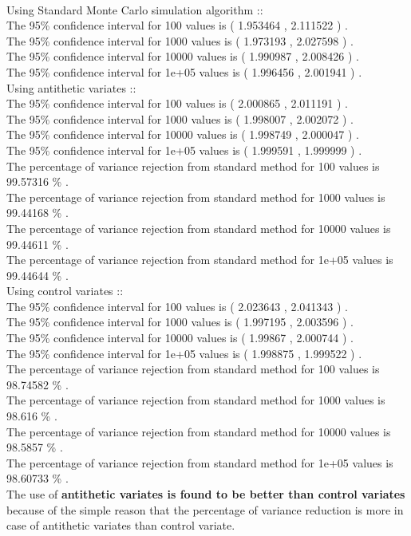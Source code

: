 \documentclass[11pt]{article}
\begin{document}
\newpage
{}\\
Using Standard Monte Carlo simulation algorithm ::\\
The 95\% confidence interval for 100 values is ( 1.953464 , 2.111522 ) .\\
The 95\% confidence interval for 1000 values is ( 1.973193 , 2.027598 ) .\\
The 95\% confidence interval for 10000 values is ( 1.990987 , 2.008426 ) .\\
The 95\% confidence interval for 1e+05 values is ( 1.996456 , 2.001941 ) .\\

Using antithetic variates ::\\
The 95\% confidence interval for 100 values is ( 2.000865 , 2.011191 ) .\\
The 95\% confidence interval for 1000 values is ( 1.998007 , 2.002072 ) .\\
The 95\% confidence interval for 10000 values is ( 1.998749 , 2.000047 ) .\\
The 95\% confidence interval for 1e+05 values is ( 1.999591 , 1.999999 ) .\\
The percentage of variance rejection from standard method for 100 values is 99.57316 \% .\\
The percentage of variance rejection from standard method for 1000 values is 99.44168 \% .\\
The percentage of variance rejection from standard method for 10000 values is 99.44611 \% .\\
The percentage of variance rejection from standard method for 1e+05 values is 99.44644 \% .\\

Using control variates ::\\
The 95\% confidence interval for 100 values is ( 2.023643 , 2.041343 ) .\\
The 95\% confidence interval for 1000 values is ( 1.997195 , 2.003596 ) .\\
The 95\% confidence interval for 10000 values is ( 1.99867 , 2.000744 ) .\\
The 95\% confidence interval for 1e+05 values is ( 1.998875 , 1.999522 ) .\\
The percentage of variance rejection from standard method for 100 values is 98.74582 \% .\\
The percentage of variance rejection from standard method for 1000 values is 98.616 \% .\\
The percentage of variance rejection from standard method for 10000 values is 98.5857 \% .\\
The percentage of variance rejection from standard method for 1e+05 values is 98.60733 \% .\\

The use of \textbf{antithetic variates is found to be better than control variates} because of the simple reason that the percentage of variance reduction is more in case of antithetic variates than control variate.
\end{document}
